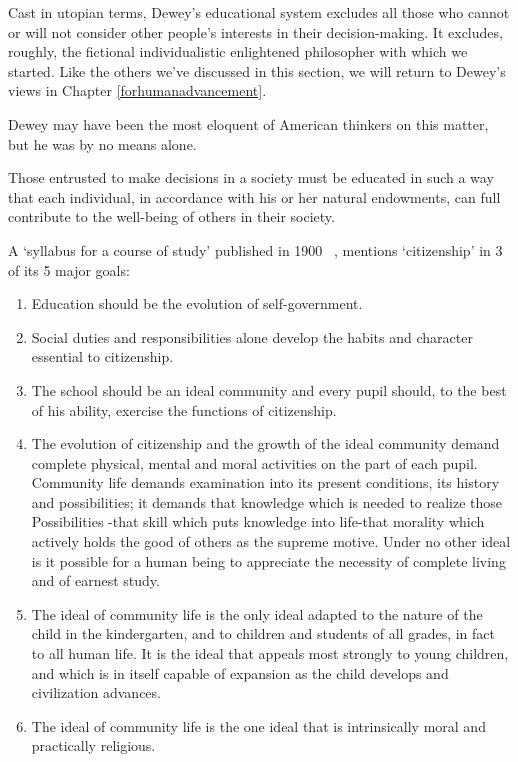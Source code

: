 Cast in utopian terms, Dewey's educational system excludes all those who cannot or will not consider other people's interests in their decision-making. It excludes, roughly, the fictional individualistic enlightened philosopher with which we started. Like the others we've discussed in this section, we will return to Dewey's views in Chapter \ref{forhumanadvancement}.

Dewey may have been the most eloquent of American thinkers on this matter, but he was by no means alone.  
\begin{thesis}\label{eq:democracyDewey}
Those entrusted to make decisions in a society must be educated in such a way that each individual, in accordance with his or her natural endowments, can full contribute to the well-being of others in their society.\end{thesis} A `syllabus for a course of study' published in 1900 ~\citep{Parker:1900ig}, mentions `citizenship' in 3 of its 5 major goals: 

\begin{enumerate}
\item Education should be the evolution of self-government.

\item Social duties and responsibilities alone develop the habits and character essential to citizenship.

\item The school should be an ideal community and every pupil should, to the best of his ability, exercise the functions of citizenship. 

\item The evolution of citizenship and the growth of the ideal community demand complete physical, mental and moral activities on the part of each pupil. Community life demands examination into its present conditions, its history and possibilities; it demands that knowledge which is needed to realize those Possibilities -that skill which puts knowledge into life-that morality which actively holds the good of others as the supreme motive. Under no other ideal is it possible for a human being to appreciate the necessity of complete living and of earnest study. 

\item The ideal of community life is the only ideal adapted to the nature of the child in the kindergarten, and to children and students of all grades, in fact to all human life. It is the ideal that appeals most strongly to young children, and which is in itself capable of expansion as the child develops and civilization advances. 

\item The ideal of community life is the one ideal that is intrinsically moral and practically religious. 

\end{enumerate}

